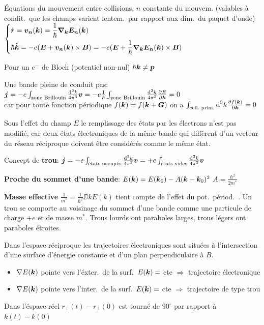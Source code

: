 \begin{squishlist}
    \item Équations du mouvement entre collisions, $n$ constante du mouvem. (valables à condit.\ que les champs varient lentem.\ par rapport aux dim.\ du paquet d'onde)
    $ \left\{ \begin{aligned} 
        & \dot{\vec{r}} = \vec{v_n}(\vk) = \frac{1}{\hbar} \vec{\nabla_\vec{k}E_n}(\vk) \\
        & \hbar \dot{\vec{k}} =  -e (\vec{E} + \vec{v_n}(\vk) \times \vec{B}) =  -e (\vec{E} + \frac{1}{\hbar} \vec{\nabla_\vec{k}E_n}(\vk) \times \vec{B})
    \end{aligned} \right. $
    
    \item Pour un $e^-$ de Bloch (potentiel non-nul) $\hbar \vk \neq \vec{p}$
    \item Une bande pleine de conduit pas: \\
    $\vec{j} = -e \int_{\text{zone Brillouin}} \frac{\ud^3 k}{4 \pi^3}\vec{v} = -e \frac{1}{\hbar} \int_{\text{zone Brillouin}} \frac{\ud^3 k}{4 \pi^3} \D{\vec{k}}{E} = 0$ \\
    car pour toute fonction périodique $f(\vk) = f(\vk + \vG)$ on a $\int_{\text{cell.\ prim.}}\ud^3 k \D{\vk}{f(\vk)} = 0$
    \item Sous l’eﬀet du champ $E$ le remplissage
    des états par les électrons n’est pas modifié, car deux états électroniques de la même bande qui diffèrent d’un vecteur du réseau réciproque doivent être considérés comme le même état.
    \item Concept de \textbf{trou}: $\vec{j} = -e \int_{\text{états occupés}} \frac{\ud^3 k}{4 \pi^3}\vec{v} = +e \int_{\text{états vides}} \frac{\ud^3 k}{4 \pi^3}\vec{v}$
    \item \textbf{Proche du sommet d'une bande}: $E(\vk) = E(\vk_0) - A(\vk - \vk_0)^2$ \quad $A = \frac{\hbar^2}{2m^*}$\\
    \item \textbf{Masse effective} $\frac{1}{m^*}= \frac{1}{\hbar^2}\DD{k}{E(k)}$ tient compte de l'effet du pot.\ périod.\ .
    Un trou se comporte au voisinage du sommet d’une bande
    comme une particule de charge $+e$ et de masse $m^*$. Trous lourds ont paraboles larges, trous légers ont paraboles étroites.

    \item Dans l’espace réciproque les trajectoires électroniques sont situées à l’intersection d’une surface d’énergie constante et d’un plan perpendiculaire à $B$.
    \begin{itemize}
        \item $\nabla E(\vk)$ pointe vers l'éxter.\ de la surf.\ $E(\vk) = $ cte $\Rightarrow$ trajectoire électronique
        \item $\nabla E(\vk)$ pointe vers l'inter.\ de la surf.\ $E(\vk) = $ cte $\Rightarrow$ trajectoire de type trou
    \end{itemize}
    \item Dans l'éspace réel $r_{\perp}(t) - r_{\perp}(0)$ est tourné de $90^{\circ}$ par rapport à $k(t) - k(0)$
\end{squishlist}

